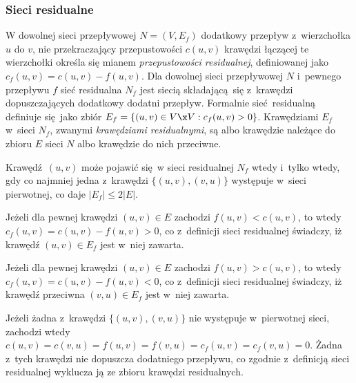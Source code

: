 \subsubsection{\textbf{Sieci residualne}}
\par{
  W dowolnej sieci przepływowej $N=(V, E_f)$ dodatkowy przepływ z~wierzchołka $u$ do $v$, nie przekraczający przepustowości $c(u, v)$ krawędzi łączącej te wierzchołki określa się mianem \emph{przepustowości residualnej}, definiowanej jako $c_f(u ,v) = c(u, v) - f(u, v)$.
  Dla dowolnej sieci przepływowej $N$ i~pewnego przepływu $f$ sieć residualna $N_f$ jest siecią składającą się z~krawędzi dopuszczających dodatkowy dodatni przepływ. Formalnie sieć residualną definiuje się jako zbiór $E_f=\{(u, v) \in V \x V: c_f(u,v) > 0\}$.
  Krawędziami $E_f$ w~sieci $N_f$, zwanymi \emph{krawędziami residualnymi}, są albo krawędzie należące do zbioru $E$ sieci $N$ albo krawędzie do nich przeciwne.
  \begin{theorem}
    Krawędź $(u, v)$ może pojawić się w sieci residualnej $N_f$ wtedy i~tylko wtedy, gdy co najmniej jedna z~krawędzi $\{(u, v), (v, u)\}$ występuje w~sieci pierwotnej, co daje $|E_f| \leq 2|E|$.
  \end{theorem}
  \begin{bproof}
    Jeżeli dla pewnej krawędzi $(u, v) \in E$ zachodzi $f(u, v) < c(u, v)$, to wtedy $c_f(u, v) = c(u, v) - f(u, v) > 0$, co z~definicji sieci residualnej świadczy, iż krawędź $(u, v) \in E_f$ jest w~niej zawarta.

    Jeżeli dla pewnej krawędzi $(u, v) \in E$ zachodzi $f(u, v) > c(u, v)$, to wtedy $c_f(u, v) = c(u, v) - f(u, v) < 0$, co z~definicji sieci residualnej świadczy, iż krawędź przeciwna $(v, u) \in E_f$  jest w~niej zawarta.

    Jeżeli żadna z~krawędzi $\{(u, v), (v, u)\}$ nie występuje w~pierwotnej sieci, zachodzi wtedy $c(u, v) = c(v, u) = f(u, v) = f(v, u) = c_f(u, v) = c_f(v, u)=0$. Żadna z~tych krawędzi nie dopuszcza dodatniego przepływu, co zgodnie z~definicją sieci residualnej wyklucza ją ze zbioru krawędzi residualnych.
  \end{bproof}
}

